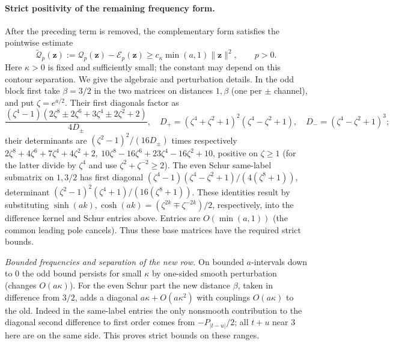 \paragraph{Strict positivity of the remaining frequency form.}
After the preceding term is removed, the complementary form satisfies
the pointwise estimate
\[
 \widetilde{\mathscr Q}_p(\mathbf z)
 :=\mathscr Q_p(\mathbf z)-\mathscr E_p(\mathbf z)
 \ge c_\kappa\min(a,1)\|\mathbf z\|^2,\qquad p>0.
\]
Here \(\kappa>0\) is fixed and sufficiently small; the constant may depend
on this contour separation. We give the algebraic and perturbation details. In the odd block first take \(\beta=3/2\) in the two matrices on distances \(1,\beta\) (one per \(\pm\) channel), and put \(\zeta=e^{a/2}\). Their first diagonals factor as
\[
 \frac{(\zeta^4-1)(2\zeta^8\pm2\zeta^6+3\zeta^4\pm2\zeta^2+2)}{4D_\pm},
 \quad D_+=(\zeta^4+\zeta^2+1)^2(\zeta^4-\zeta^2+1),\quad
 D_-=(\zeta^4-\zeta^2+1)^3;
\]
their determinants are \((\zeta^2-1)^2/(16D_\pm)\) times respectively
\(2\zeta^8+4\zeta^6+7\zeta^4+4\zeta^2+2,\ 10\zeta^8-16\zeta^6+23\zeta^4-16\zeta^2+10\), positive on \(\zeta\ge1\) (for the latter divide by \(\zeta^4\) and use \(\zeta^2+\zeta^{-2}\ge2\)). The even Schur same-label submatrix on \(1,3/2\) has first diagonal \((\zeta^4-1)(\zeta^4-\zeta^2+1)/(4(\zeta^8+1))\), determinant \((\zeta^2-1)^2(\zeta^4+1)/(16(\zeta^8+1))\). These identities result by substituting \(\sinh(ak),\cosh(ak)=(\zeta^{2k}\mp\zeta^{-2k})/2\), respectively, into the difference kernel and Schur entries above. Entries are \(O(\min(a,1))\) (the common leading pole cancels). Thus these base matrices have the required strict bounds.


\emph{Bounded frequencies and separation of the new row.}
On bounded \(a\)-intervals down to 0 the odd bound persists for small \(\kappa\) by one-sided smooth perturbation (changes \(O(a\kappa)\)). For the even Schur part the new distance \(\beta\), taken in difference from \(3/2\), adds a diagonal \(a\kappa+O(a\kappa^2)\) with couplings \(O(a\kappa)\) to the old. Indeed in the same-label entries the only nonsmooth contribution to the diagonal second difference to first order comes from \(-P_{|t-u|}/2\); all \(t+u\) near 3 here are on the same side. This proves strict bounds on these ranges.

